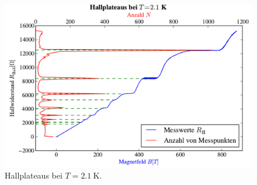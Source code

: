 \documentclass[paper=a4,fontsize=10pt,DIV=18,twocolumn,parskip=half]{scrartcl}
\numberwithin{equation}{section}    %
\begin{document}
\begin{figure}[htp]
	\begin{center}
		\includegraphics[width=\columnwidth]{Data-Plots/04-2,1-Hallplateaus.pdf}
		\caption{Hallplateaus bei $T=\SI{2.1}{\kelvin}$.}
		\label{hallplateau21}
	\end{center}
\end{figure}

\end{document}
